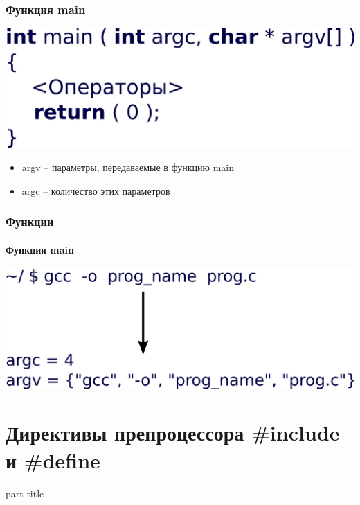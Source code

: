 \documentclass[14pt,pdf,hyperref={unicode}]{beamer}
\begin{document}
\begin{frame}[fragile]
\frametitle{Функция main}  
\begin{center}
\includegraphics[width=0.7\linewidth]{images/function_syntax_main_args.png}
\end{center}
\begin{itemize}
\item argv -- параметры, передаваемые в функцию main
\item argc -- количество этих параметров
\end{itemize}
\end{frame}

\begin{frame}[fragile]
\frametitle{Функции} 
\framesubtitle{Функция main}
\begin{center}
\includegraphics[width=1.0\linewidth]{images/function_argcargv.png}
\end{center}
\end{frame}


\section{Директивы препроцессора \#include и \#define}
\begin{frame}
\begin{center}
\begin{beamercolorbox}[sep=8pt,center]{part
title}
\insertsection
\end{beamercolorbox}
\end{center}
\end{frame}
\end{document}

